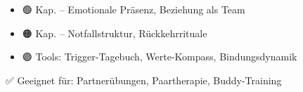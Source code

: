 \hfill\break
\hfill\break

\hypertarget{ctmm-integration-navigation}{%
\subsection[🧭 \ul{\textbf{\textcolor{ctmmBlue}{\1}}}]{\texorpdfstring{\protect\hypertarget{ctmm-integration-navigation}{}{}🧭 \ul{\textbf{\textcolor{ctmmBlue}{\1}}}}{🧭 CTMM-INTEGRATION \& NAVIGATION}}\label{ctmm-integration-navigation}}

\begin{itemize}[label=\textcolor{ctmmOrange}{\faArrowRight}]
\item
  🟢 Kap. \textbf{\textcolor{ctmmBlue}{\1}} -- Emotionale Präsenz, Beziehung als Team
\item
  🟠 Kap. \textbf{\textcolor{ctmmBlue}{\1}} -- Notfallstruktur, Rückkehrrituale
\item
  🟣 Tools: Trigger-Tagebuch, Werte-Kompass, Bindungsdynamik
\end{itemize}

\hfill\break
\hfill\break

✅ Geeignet für: Partnerübungen, Paartherapie, Buddy-Training

\hfill\break
\hfill\break

📎 \textbf{\textcolor{ctmmBlue}{\1}}
